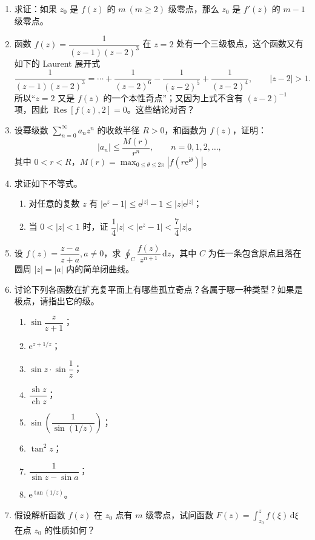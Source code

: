 \documentclass[UTF8,11pt,a4paper]{ctexart}
\newcommand{\dd}{\,\mathrm{d}}
\newcommand{\ee}{\mathrm{e}}
\newcommand{\ii}{\mathrm{i}}
\newcommand{\Res}{\operatorname{Res}}
\newcommand{\sh}{\operatorname{sh}}
\newcommand{\ch}{\operatorname{ch}}
\begin{document}
\begin{enumerate}
\item 求证：如果 $z_0$ 是 $f(z)$ 的 $m\ (m\geqslant2)$ 级零点，那么 $z_0$ 是 $f'(z)$ 的 $m-1$ 级零点。

\item 函数 $f(z)=\dfrac1{(z-1)(z-2)^3}$ 在 $z=2$ 处有一个三级极点，这个函数又有如下的 Laurent 展开式
\[
\frac1{(z-1)(z-2)^3}=\cdots+\frac1{(z-2)^6}-\frac1{(z-2)^5}+\frac1{(z-2)^4},\qquad |z-2|>1.
\]
所以“$z=2$ 又是 $f(z)$ 的一个本性奇点”；又因为上式不含有 $(z-2)^{-1}$ 项，因此
$\Res[f(z),2]=0$。这些结论对否？

\item 设幂级数 $\displaystyle\sum_{n=0}^{\infty}a_nz^n$ 的收敛半径 $R>0$，和函数为 $f(z)$，证明：
\[
|a_n|\leqslant\frac{M(r)}{r^n},\qquad n=0,1,2,\ldots,
\]
其中 $0<r<R$，$M(r)=\displaystyle\max_{0\leqslant\theta\leqslant2\pi}|f(r\ee^{\ii\theta})|$。

\item 求证如下不等式。
  \begin{enumerate}
  \item 对任意的复数 $z$ 有 $|\ee^z-1|\leqslant\ee^{|z|}-1\leqslant|z|\ee^{|z|}$；
  \item 当 $0<|z|<1$ 时，证 $\dfrac14|z|<|\ee^z-1|<\dfrac74|z|$。
  \end{enumerate}

\item 设 $f(z)=\dfrac{z-a}{z+a},a\ne0$，求
$\displaystyle\oint_C\dfrac{f(z)}{z^{n+1}}\dd z$，其中 $C$ 为任一条包含原点且落在圆周 $|z|=|a|$ 内的简单闭曲线。

\item 讨论下列各函数在扩充复平面上有哪些孤立奇点？各属于哪一种类型？如果是极点，请指出它的级。
  \begin{enumerate}
  \item $\sin\dfrac z{z+1}$；
  \item $\ee^{z+1/z}$；
  \item $\sin z\cdot\sin\dfrac1z$；
  \item $\dfrac{\sh z}{\ch z}$；
  \item $\sin\left(\dfrac1{\sin(1/z)}\right)$；
  \item $\tan^2z$；
  \item $\dfrac1{\sin z-\sin a}$；
  \item $\ee^{\tan(1/z)}$。
  \end{enumerate}

\item 假设解析函数 $f(z)$ 在 $z_0$ 点有 $m$ 级零点，试问函数
$\displaystyle F(z)=\int_{z_0}^z f(\xi)\dd\xi$ 在点 $z_0$ 的性质如何？
\end{enumerate}
\end{document}

